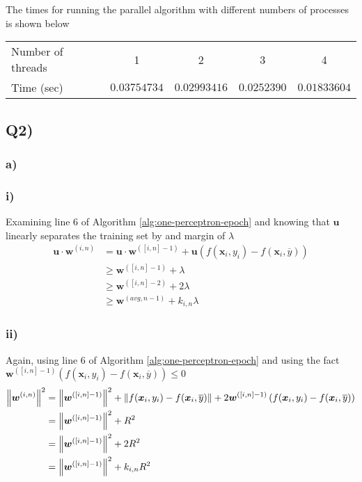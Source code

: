 The times for running the parallel algorithm with different numbers of processes is shown below
\begin{table}[h!!!]
\begin{tabular}{l|c|c|c|c}
Number of threads & 1 & 2 & 3 & 4 \\ \cline{2-5} 
Time (sec)        & $0.03754734$ & $0.02993416$ & $0.0252390$ & $0.01833604$
\end{tabular}
\end{table}

\subsection*{{\bf Q2)}}
\subsubsection*{{\bf a)}}
\subsubsection*{{\bf i)}}
Examining line $6$ of Algorithm \ref{alg:one-perceptron-epoch} and knowing that $\bm{u}$ linearly separates the training set by and margin of $\lambda$
\begin{align*}
    \bm{u} \cdot \bm{w}^{(i,n)} &= \bm{u} \cdot \bm{w}^{([i,n] - 1)} + \bm{u} \left( f (\bm{x}_{i}, y_{i}) -  f (\bm{x}_{i}, \overline{y}) \right) \\
    &\geq \bm{w}^{([i,n] - 1)} + \lambda \\
    &\geq \bm{w}^{([i,n] - 2)} + 2 \lambda \\
    &\geq \bm{w}^{(avg, n-1)} + k_{i,n} \lambda
\end{align*}

\subsubsection*{{\bf ii)}}
Again, using line $6$ of Algorithm \ref{alg:one-perceptron-epoch} and using the fact $\bm{w}^{([i,n] - 1)} \left( f (\bm{x}_{i}, y_{i}) -  f (\bm{x}_{i}, \overline{y}) \right) \leq 0$
\begin{align*}
    \left\lVert\bm{w}^{(i,n)}\right\rVert^2 &= \left\lVert\bm{w}^{([i,n] - 1)}\right\rVert^2 + \left\lVert f (\bm{x}_{i}, y_{i}) -  f (\bm{x}_{i}, \overline{y})\right\rVert + 2 \bm{w}^{([i,n] - 1)} \left( f (\bm{x}_{i}, y_{i}) -  f (\bm{x}_{i}, \overline{y}) \right) \\
    &= \left\lVert\bm{w}^{([i,n] - 1)}\right\rVert^2 + R^2 \\
    &= \left\lVert\bm{w}^{([i,n] - 1)}\right\rVert^2 + 2R^2 \\
    &= \left\lVert\bm{w}^{([i,n] - 1)}\right\rVert^2 + k_{i,n} R^2
\end{align*}

